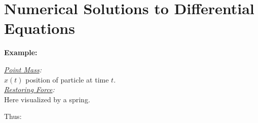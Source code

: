 \documentclass[a4paper,12pt]{report}
\begin{document}
	


\chapter{Numerical Solutions to Differential Equations}

	\noindent \textbf{Example:}

\begin{center}
\end{center}

	\noindent \textit{\underline{Point Mass}:}\\
	$x(t)$ position of particle at time $t$.\\
	
	\noindent \textit{\underline{Restoring Force}:}\\
	Here visualized by a spring.
	
\begin{multicols}{2}
\begin{center}

\end{center}
\end{multicols}

	\vspace{1cm}
	\noindent Thus:
	
\begin{center}
\end{center}
\end{document}
